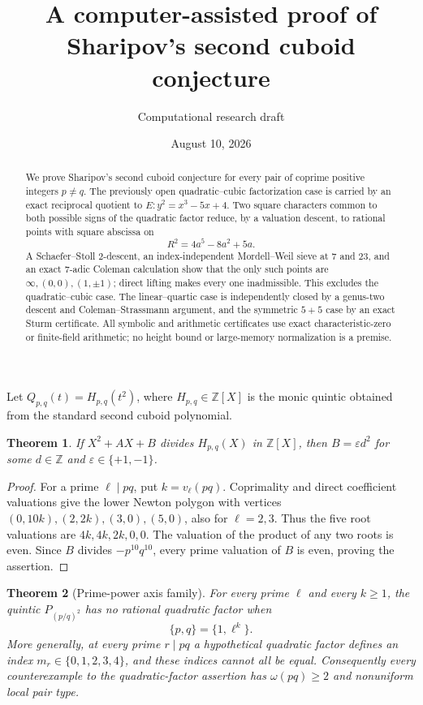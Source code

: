\documentclass[11pt]{article}
\title{A computer-assisted proof of Sharipov's second cuboid conjecture}
\author{Computational research draft}
\date{August 10, 2026}
\newtheorem{theorem}{Theorem}
\begin{document}
\maketitle

\begin{abstract}
We prove Sharipov's second cuboid conjecture for every pair of coprime
positive integers $p\ne q$.  The previously open quadratic--cubic
factorization case is carried by an exact reciprocal quotient to
$E:y^2=x^3-5x+4$.  Two square characters common to both possible signs of the
quadratic factor reduce, by a valuation descent, to rational points with
square abscissa on
\[
 R^2=4a^5-8a^2+5a.
\]
A Schaefer--Stoll 2-descent, an index-independent Mordell--Weil sieve at
$7$ and $23$, and an exact $7$-adic Coleman calculation show that the only
such points are $\infty,(0,0),(1,\pm1)$; direct lifting makes every one
inadmissible.  This excludes the quadratic--cubic case.  The linear--quartic
case is independently closed by a genus-two descent and
Coleman--Strassmann argument, and the symmetric $5+5$ case by an exact Sturm
certificate.  All symbolic and arithmetic certificates use exact
characteristic-zero or finite-field arithmetic; no height bound or
large-memory normalization is a premise.
\end{abstract}

Let $Q_{p,q}(t)=H_{p,q}(t^2)$, where $H_{p,q}\in\mathbb Z[X]$ is the monic
quintic obtained from the standard second cuboid polynomial.

\begin{theorem}
If $X^2+AX+B$ divides $H_{p,q}(X)$ in $\mathbb Z[X]$, then
$B=\varepsilon d^2$ for some $d\in\mathbb Z$ and
$\varepsilon\in\{+1,-1\}$.
\end{theorem}

\begin{proof}
For a prime $\ell\mid pq$, put $k=v_\ell(pq)$.  Coprimality and direct
coefficient valuations give the lower Newton polygon with vertices
$(0,10k),(2,2k),(3,0),(5,0)$, also for $\ell=2,3$.  Thus the five root
valuations are $4k,4k,2k,0,0$.  The valuation of the product of any two roots
is even.  Since $B$ divides $-p^{10}q^{10}$, every prime valuation of $B$ is
even, proving the assertion.
\end{proof}

\begin{theorem}[Prime-power axis family]
For every prime $\ell$ and every $k\geq1$, the quintic
$P_{(p/q)^2}$ has no rational quadratic factor when
\[
 \{p,q\}=\{1,\ell^k\}.
\]
More generally, at every prime $r\mid pq$ a hypothetical quadratic factor
defines an index $m_r\in\{0,1,2,3,4\}$, and these indices cannot all be equal.
Consequently every counterexample to the quadratic-factor assertion has
$\omega(pq)\geq2$ and nonuniform local pair type.
\end{theorem}
\end{document}

